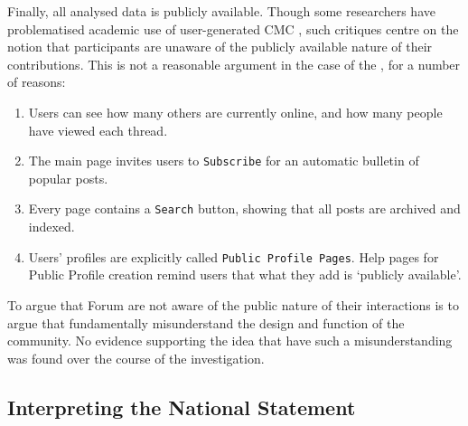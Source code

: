 
Finally, all analysed data is publicly available. Though some researchers have problematised academic use of user\hyp{}generated \gls{CMC} \cite[e.g.][]{eysenbach_towards_2000,zimmer_but_2010}, such critiques centre on the notion that participants are unaware of the publicly available nature of their contributions. This is not a reasonable argument in the case of the , for a number of reasons:

\begin{enumerate}
    \item Users can see how many others are currently online, and how many people have viewed each thread.
    \item The main page invites users to \texttt{Subscribe} for an automatic bulletin of popular posts.
    \item Every page contains a \texttt{Search} button, showing that all posts are archived and indexed.
    \item Users' profiles are explicitly called \texttt{Public Profile Pages}. Help pages for Public Profile creation remind users that what they add is `publicly available'. %
\end{enumerate}
%
To argue that \gls{Forum}  are not aware of the public nature of their interactions is to argue that  fundamentally misunderstand the design and function of the community. No evidence supporting the idea that  have such a misunderstanding was found over the course of the investigation.


\subsection{Interpreting the National Statement}

